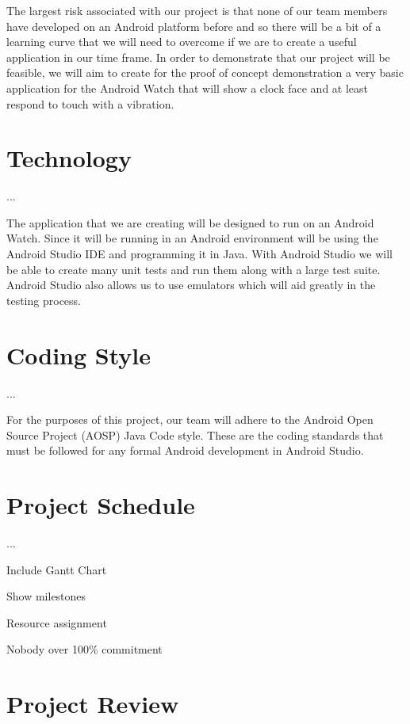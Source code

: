 \documentclass{article}
\begin{document}
The largest risk associated with our project is that none of our team members have developed on an Android platform before and so there will be a bit of a learning curve that we will need to overcome if we are to create a useful application in our time frame. In order to demonstrate that our project will be feasible, we will aim to create for the proof of concept demonstration a very basic application for the Android Watch that will show a clock face and at least respond to touch with a vibration.

\section{Technology}
...

The application that we are creating will be designed to run on an Android Watch. Since it will be running in an Android environment will be using the Android Studio IDE and programming it in Java. With Android Studio we will be able to create many unit tests and run them along with a large test suite. Android Studio also allows us to use emulators which will aid greatly in the testing process.

\section{Coding Style}
...

For the purposes of this project, our team will adhere to the Android Open Source Project (AOSP) Java Code style. These are the coding standards that must be followed for any formal Android development in Android Studio. 

\section{Project Schedule}
...

Include Gantt Chart

Show milestones

Resource assignment

Nobody over 100\% commitment


\section{Project Review}
\end{document}
